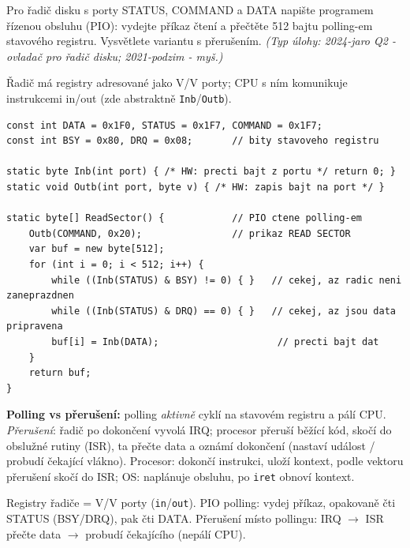 \begin{zadani}
Pro řadič disku s porty STATUS, COMMAND a DATA napište programem řízenou obsluhu (PIO): vydejte příkaz čtení a přečtěte 512 bajtu polling-em stavového registru. Vysvětlete variantu s přerušením. \emph{(Typ úlohy: 2024-jaro Q2 - ovladač pro řadič disku; 2021-podzim - myš.)}
\end{zadani}

\begin{reseni}
Řadič má registry adresované jako V/V porty; CPU s ním komunikuje instrukcemi in/out (zde abstraktně \texttt{Inb}/\texttt{Outb}).
\begin{lstlisting}
const int DATA = 0x1F0, STATUS = 0x1F7, COMMAND = 0x1F7;
const int BSY = 0x80, DRQ = 0x08;       // bity stavoveho registru

static byte Inb(int port) { /* HW: precti bajt z portu */ return 0; }
static void Outb(int port, byte v) { /* HW: zapis bajt na port */ }

static byte[] ReadSector() {            // PIO ctene polling-em
    Outb(COMMAND, 0x20);                // prikaz READ SECTOR
    var buf = new byte[512];
    for (int i = 0; i < 512; i++) {
        while ((Inb(STATUS) & BSY) != 0) { }   // cekej, az radic neni zaneprazdnen
        while ((Inb(STATUS) & DRQ) == 0) { }   // cekej, az jsou data pripravena
        buf[i] = Inb(DATA);                     // precti bajt dat
    }
    return buf;
}
\end{lstlisting}
\textbf{Polling vs přerušení:} polling \emph{aktivně} cyklí na stavovém registru a pálí CPU. \emph{Přerušení}: řadič po dokončení vyvolá IRQ; procesor přeruší běžící kód, skočí do obslužné rutiny (ISR), ta přečte data a oznámí dokončení (nastaví událost / probudí čekající vlákno). Procesor: dokončí instrukci, uloží kontext, podle vektoru přerušení skočí do ISR; OS: naplánuje obsluhu, po \texttt{iret} obnoví kontext.
\end{reseni}

\begin{jadro}
Registry řadiče = V/V porty (\texttt{in}/\texttt{out}). PIO polling: vydej příkaz, opakovaně čti STATUS (BSY/DRQ), pak čti DATA. Přerušení místo pollingu: IRQ $\to$ ISR přečte data $\to$ probudí čekajícího (nepálí CPU).
\end{jadro}

